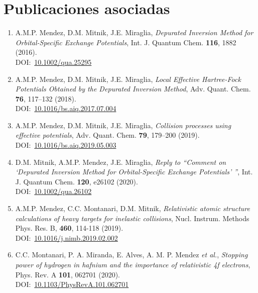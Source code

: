 \chapter*{Publicaciones asociadas}
\label{chap:publicaciones}

\begin{enumerate}

\item
A.M.P. Mendez, D.M. Mitnik, J.E. Miraglia,
\textit{Depurated Inversion Method for Orbital-Specific Exchange Potentials},
Int. J. Quantum Chem. \textbf{116}, 1882 (2016). \\
DOI:~\href{http://www.doi.org/10.1002/qua.25295}{10.1002/qua.25295}

\item
A.M.P. Mendez, D.M. Mitnik, J.E. Miraglia, 
\textit{Local Effective Hartree-Fock Potentials Obtained by the Depurated Inversion Method},
Adv. Quant. Chem. \textbf{76}, 117--132 (2018). \\
DOI:~\href{http://www.doi.org/10.1016/bs.aiq.2017.07.004}{10.1016/bs.aiq.2017.07.004}

\item
A.M.P. Mendez, D.M. Mitnik, J.E. Miraglia, 
\textit{Collision processes using effective potentials},
Adv. Quant. Chem. \textbf{79}, 179--200 (2019). \\
DOI:~\href{http://www.doi.org/10.1016/bs.aiq.2019.05.003}{10.1016/bs.aiq.2019.05.003}

\item
D.M. Mitnik, A.M.P. Mendez, J.E. Miraglia, 
\textit{Reply to ``Comment on `Depurated Inversion Method for Orbital-Specific
Exchange Potentials' ''}, 
Int. J. Quantum Chem. \textbf{120}, e26102 (2020). \\
DOI:~\href{http://www.doi.org/10.1002/qua.26102}{10.1002/qua.26102}

\item
A.M.P. Mendez, C.C. Montanari, D.M. Mitnik, 
\textit{Relativistic atomic structure calculations of heavy targets for inelastic collisions},
Nucl. Instrum. Methods Phys. Res. B, \textbf{460}, 114-118 (2019). \\
DOI:~\href{http://www.doi.org/10.1016/j.nimb.2019.02.002}{10.1016/j.nimb.2019.02.002}

\item
C.C. Montanari, P. A. Miranda, E. Alves, A. M. P. Mendez \textit{et al.},
\textit{Stopping power of hydrogen in hafnium and the importance of relativistic 4f electrons},
Phys. Rev. A \textbf{101}, 062701 (2020). \\
DOI:~\href{http://www.doi.org/10.1103/PhysRevA.101.062701}{10.1103/PhysRevA.101.062701} \\ \\


\end{enumerate}
